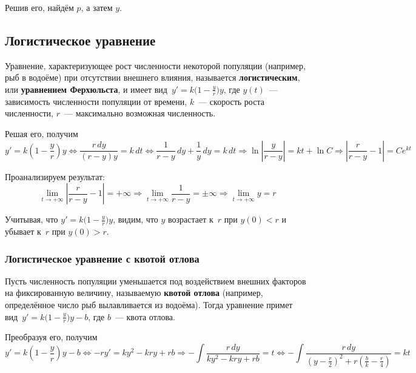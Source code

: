 Решив его, найдём $p$, а затем $y$.

\subsection{Логистическое уравнение}
  Уравнение, характеризующее рост численности некоторой популяции (например, рыб в водоёме) при отсутствии внешнего влияния, называется \textbf{логистическим}, или \textbf{уравнением Ферхюльста}, и имеет вид~$y' = k \bigl( 1 - \frac{y}r \bigr) y$, где $y(t)$~--- зависимость численности популяции от времени, $k$~--- скорость роста численности, $r$~--- максимально возможная численность.

Решая его, получим
\begin{equation*}
y' = k \left(1 - \frac{y}r\right) y \Leftrightarrow
\frac{r\,dy}{(r - y)y} = k\,dt \Leftrightarrow
\frac1{r - y}\,dy + \frac1y\,dy = k\,dt \Rightarrow
\ln \left| \frac{y}{r - y} \right| = kt + \ln C \Rightarrow
\left| \frac{r}{r - y} - 1 \right| = C e^{kt}
\end{equation*}

Проанализируем результат:
\begin{equation*}
\lim_{t \to +\infty} \left| \frac{r}{r - y} - 1 \right| = +\infty \Rightarrow
\lim_{t \to +\infty} \frac1{r - y} = \pm\infty \Rightarrow
\lim_{t \to +\infty} y = r
\end{equation*}

Учитывая, что $y' = k \bigl( 1 - \frac{y}r \bigr) y$, видим, что $y$ возрастает к~$r$ при $y(0) < r$ и убывает к~$r$ при $y(0) > r$.

\subsubsection{Логистическое уравнение с квотой отлова}
Пусть численность популяции уменьшается под воздействием внешних факторов на фиксированную величину, называемую \textbf{квотой отлова} (например, определённое число рыб вылавливается из водоёма).
Тогда уравнение примет вид~$y' = k \bigl( 1 - \frac{y}r \bigr) y - b$, где $b$~--- квота отлова.

Преобразуя его, получим
\begin{equation*}
y' = k \left( 1 - \frac{y}r \right) y - b \Leftrightarrow
-ry' = ky^2 - kry + rb \Rightarrow
-\int \frac{r\,dy}{ky^2 - kry + rb} = t \Leftrightarrow
-\int \frac{r\,dy}{\left( y - \frac{r}2 \right)^2 + r\left( \frac{b}k - \frac{r}4 \right)} = kt
\end{equation*}

